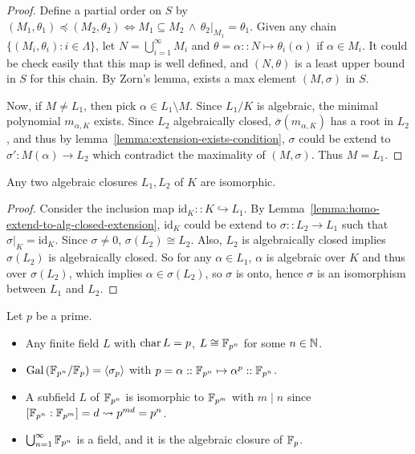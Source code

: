 \begin{theorem}
\begin{lemma}
\begin{proof}
      Define a partial order on $S$ by $(M_1, \theta_1) \preceq (M_2, \theta_2)
      \iff M_1 \subseteq M_2 \,\land\, \theta_2 \big|_{M_1} = \theta_1$.
      Given any chain $\{(M_i, \theta_i) : i \in \Lambda \}$, let $N = \bigcup_{i = 1}^\infty M_i$ and
      $\theta = \alpha :: N \mapsto \theta_i(\alpha)$ if $\alpha \in M_i$. It could
      be check easily that this map is well defined, and $(N, \theta)$ is
      a least upper bound in $S$ for this chain.  By Zorn's lemma, exists a max element $(M, \sigma)$ in $S$.

      Now, if $M \neq L_1$, then pick $\alpha \in L_1 \setminus M$. Since $L_1/K$ is algebraic,
      the minimal polynomial $m_{\alpha, K}$ exists. Since $L_2$ algebraically closed, $\bar\sigma(m_{\alpha, K})$
      has a root in $L_2$, and thus by lemma~\ref{lemma:extension-exists-condition},
      $\sigma$ could be extend to $\sigma': M(\alpha) \to L_2$ which contradict the maximality of $(M, \sigma)$.
      Thus $M = L_1$.
    \end{proof}
  \end{lemma}

  \begin{theorem}
    Any two algebraic closures $L_1, L_2$ of $K$ are isomorphic.
    \begin{proof}
      Consider the inclusion map $\text{id}_K :: K \hookrightarrow L_1$.
      By Lemma~\ref{lemma:homo-extend-to-alg-closed-extension},
      $\text{id}_K$ could be extend to $\sigma :: L_2 \to L_1$ such that $\sigma\big|_K = \text{id}_K$.
      Since $\sigma \neq 0$, $\sigma(L_2) \cong L_2$.
      Also, $L_2$ is algebraically closed implies $\sigma(L_2)$ is algebraically closed.
      So for any $\alpha \in L_1$, $\alpha$ is algebraic over $K$ and thus over $\sigma(L_2)$,
      which implies $\alpha \in \sigma(L_2)$, so $\sigma$ is onto, hence $\sigma$ is an
      isomorphism between $L_1$ and $L_2$.
    \end{proof}
  \end{theorem}

  \begin{example}
    Let $p$ be a prime.
    \begin{itemize}
      \item Any finite field $L$ with $\operatorname{char} L = p$, $L \cong \mathbb{F}_{p^n}$ for
        some $n \in \mathbb{N}$.
      \item $\operatorname{Gal}\left(\mathbb{F}_{p^n} / \mathbb{F}_p\right) = \langle\sigma_p\rangle$ with
        $p = \alpha :: \mathbb{F}_{p^n} \mapsto \alpha^p :: \mathbb{F}_{p^n}$.
      \item A subfield $L$ of $\mathbb{F}_{p^n}$ is isomorphic to $\mathbb{F}_{p^m}$ with
        $m \mid n$ since $[\mathbb{F}_{p^n} : \mathbb{F}_{p^m}] = d \leadsto p^{md} = p^n$.
      \item $\bigcup_{n=1}^\infty \mathbb{F}_{p^n}$ is a field, and it is the
        algebraic closure of $\mathbb{F}_p$.
    \end{itemize}
  \end{example}
\end{theorem}

